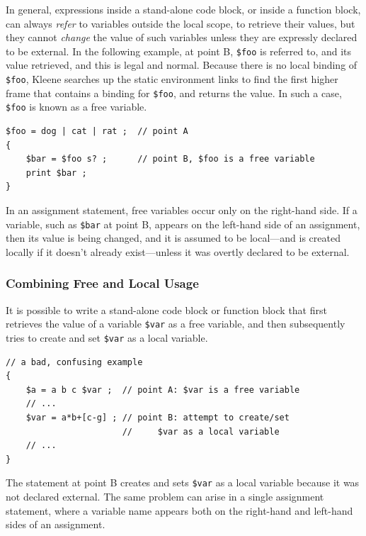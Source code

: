 \documentclass[letterpaper,12pt]{article}
\begin{document}
In general, expressions inside a stand-alone code block, or inside a function block, can
always \emph{refer} to variables outside the local scope, to retrieve their values, but
they cannot \emph{change} the value of such variables unless they are expressly declared to be
external. In the following example, at point B, \verb!$foo! is referred to, and its
value retrieved, and this is legal and normal.  Because there is no local binding of
\verb!$foo!, Kleene searches up the static environment links to find the first higher
frame that contains a binding for \verb!$foo!,  and returns the value.  In such a case,
\verb!$foo! is known as a free variable.

\begin{samepage}
\begin{Verbatim}[fontsize=\small]
$foo = dog | cat | rat ;  // point A
{
    $bar = $foo s? ;      // point B, $foo is a free variable
    print $bar ;
}
\end{Verbatim}
\end{samepage}

\noindent 
In an assignment statement, free variables occur only on the right-hand side.
If a variable, such as \verb!$bar! at point B, 
appears on the left-hand side of an assignment, then its value is being
changed, and it is assumed to be local---and is created locally if it doesn't already
exist---unless it was overtly declared to be external.

\subsubsection{Combining Free and Local Usage}

It is possible to write a stand-alone code block or function block that first retrieves
the value of a
variable \verb!$var! as a free variable, and then subsequently tries to create and set
\verb!$var! as a local variable.

\begin{samepage}
\begin{Verbatim}[fontsize=\small]
// a bad, confusing example
{
    $a = a b c $var ;  // point A: $var is a free variable
    // ...
    $var = a*b+[c-g] ; // point B: attempt to create/set
                       //     $var as a local variable
    // ...
}
\end{Verbatim}
\end{samepage}

\noindent
The statement at point B creates and sets \verb!$var! as a local variable because it was
not declared external.  The same problem can arise in a single assignment statement,
where a variable name appears both on the right-hand and left-hand sides of an
assignment.
\end{document}
